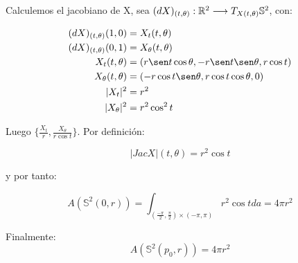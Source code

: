 \begin{remark}
Calculemos el jacobiano de X, sea $(dX)_{(t, \theta)}: \mathbb{R}^2 \longrightarrow T_{X(t,\theta)} \mathbb{S}^2$, con:

\begin{align*}
    (dX)_{(t, \theta)}(1,0) &= X_t(t, \theta) \\
    (dX)_{(t, \theta)}(0,1) &= X_\theta(t, \theta) \\
    X_t(t, \theta) &= (r\sen t\cos\theta, -r\sen t\sen\theta, r\cos t) \\
    X_\theta(t, \theta) &= (-r\cos t\sen\theta, r\cos t\cos\theta, 0) \\
    |X_t|^2 &= r^2 \\
    |X_\theta|^2 &= r^2\cos^2t
\end{align*}

Luego $\{ \frac{X_t}{r}, \frac{X_\theta}{r\cos t} \}$. Por definición:

\begin{equation*}
    |Jac X|(t,\theta) = r^2\cos t
\end{equation*}

y por tanto:

\begin{equation*}
    A(\mathbb{S}^2(0,r)) = \int_{(\frac{-\pi}{2}, \frac{\pi}{2}) \times (-\pi, \pi)} r^2\cos t da = 4\pi r^2
\end{equation*}

Finalmente:
\begin{equation*}
    A(\mathbb{S}^2(p_0,r)) = 4\pi r^2
\end{equation*}
\end{remark}

